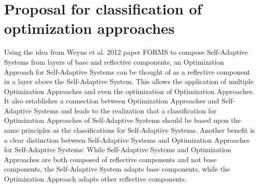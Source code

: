 \newpage
\section{Proposal for classification of optimization approaches}
\label{ch:Proposal}




Using the idea from Weyns et al. 2012 paper FORMS \cite*{FORMS} to compose Self-Adaptive Systems from
layers of base and reflective components, 
an Optimization Approach for Self-Adaptive Systems can be thought of
as a reflective component in a layer above the Self-Adaptive System.
This allows the application of multiple Optimization Approaches and even the 
optimization of Optimization Approaches.
It also establishes a connection between Optimization Approaches and Self-Adaptive Systems
and leads to the realization that a classification for Optimization Approaches of Self-Adaptive Systems
should be based upon the same principles as the classifications for Self-Adaptive Systems.
Another benefit is a clear distinction between Self-Adaptive Systems and Optimization Approaches for Self-Adaptive Systems:
While Self-Adaptive Systems and Optimization Approaches are both composed of reflective components and not base components,
the Self-Adaptive System adapts base components, while the Optimization Approach adapts other reflective components.
\newline
\par


